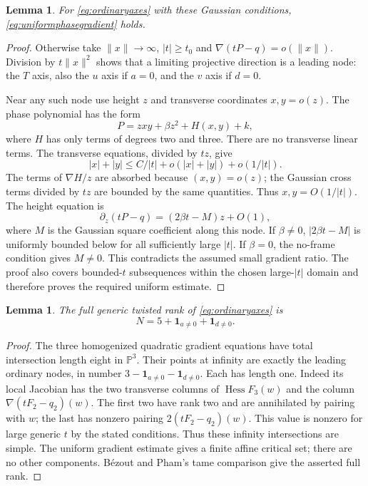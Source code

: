\documentclass[11pt]{article}
\newtheorem{lemma}[theorem]{Lemma}
\theoremstyle{definition}\newtheorem{definition}[theorem]{Definition}
\theoremstyle{remark}\newtheorem{remark}[theorem]{Remark}
\begin{document}
\begin{lemma}\label{lem:axisuniformgradient}
For \eqref{eq:ordinaryaxes} with these Gaussian conditions,
\eqref{eq:uniformphasegradient} holds.
\end{lemma}
\begin{proof}
Otherwise take $\|x\|\to\infty$, $|t|\ge t_0$ and
$\nabla(tP-q)=o(\|x\|)$. Division by $t\|x\|^2$ shows that
a limiting projective direction is a leading node: the $T$ axis,
also the $u$ axis if $a=0$, and the $v$ axis if $d=0$.

Near any such node use height $z$ and transverse coordinates
$x,y=o(z)$. The phase polynomial has the form
\[
 P=zxy+\beta z^2+H(x,y)+k,
\]
where $H$ has only terms of degrees two and three. There are
no transverse linear terms. The transverse equations, divided
by $tz$, give
\[
 |x|+|y|\le C/|t|+o(|x|+|y|)+o(1/|t|).
\]
The terms of $\nabla H/z$ are absorbed because $(x,y)=o(z)$;
the Gaussian cross terms divided by $tz$ are bounded by the
same quantities. Thus $x,y=O(1/|t|)$. The height equation is
\[
 \partial_z(tP-q)=(2\beta t-M)z+O(1),
\]
where $M$ is the Gaussian square coefficient along this node.
If $\beta\ne0$, $|2\beta t-M|$ is uniformly bounded below
for all sufficiently large $|t|$. If $\beta=0$, the no-frame
condition gives $M\ne0$. This contradicts the assumed small
gradient ratio. The proof also covers bounded-$t$ subsequences
within the chosen large-$|t|$ domain and therefore proves the
required uniform estimate.
\end{proof}

\begin{lemma}\label{lem:axisrank}
The full generic twisted rank of \eqref{eq:ordinaryaxes} is
\[
 N=5+\mathbf1_{a\ne0}+\mathbf1_{d\ne0}.
\]
\end{lemma}
\begin{proof}
The three homogenized quadratic gradient equations have total
intersection length eight in $\mathbb P^3$. Their points at
infinity are exactly the leading ordinary nodes, in number
$3-\mathbf1_{a\ne0}-\mathbf1_{d\ne0}$. Each has length one.
Indeed its local Jacobian has the two transverse columns of
$\operatorname{Hess}F_3(w)$ and the column $\nabla(tF_2-q_2)(w)$.
The first two have rank two and are annihilated by pairing with
$w$; the last has nonzero pairing
$2(tF_2-q_2)(w)$. This value is nonzero for large generic $t$
by the stated conditions. Thus these infinity intersections are
simple. The uniform gradient estimate gives a finite affine
critical set; there are no other components. B\'ezout and
Pham's tame comparison give the asserted full rank.
\end{proof}
\end{document}
